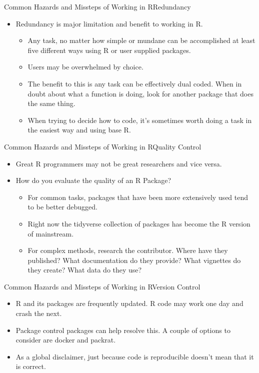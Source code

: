 \documentclass{beamer}
\begin{document}
\begin{frame}{Common Hazards and Missteps of Working in R}{Redundancy}
\begin{itemize}

    \item Redundancy is major limitation and benefit to working in R.
    \begin{itemize}
        \item Any task, no matter how simple or mundane can be accomplished at least five different ways using R or user supplied packages.
        \item Users may be overwhelmed by choice. 
        \item The benefit to this is any task can be effectively dual coded.  When in doubt about what a function is doing, look for another package that does the same thing.
        \item When trying to decide how to code, it's sometimes worth doing a task in the easiest way and using base R.  
    \end{itemize}
\end{itemize}
\end{frame}

\begin{frame}{Common Hazards and Missteps of Working in R}{Quality Control}
\begin{itemize}
    \item Great R programmers may not be great researchers and vice versa.
    \item How do you evaluate the quality of an R Package?
    \begin{itemize}
        \item For common tasks, packages that have been more extensively used tend to be better debugged.  
        \item Right now the tidyverse collection of packages has  become the R version of mainstream.
        \item For complex methods, research the contributor.  Where have they published?  What documentation do they provide?  What vignettes do they create?  What data do they use?
    \end{itemize}
\end{itemize}
\end{frame}

\begin{frame}{Common Hazards and Missteps of Working in R}{Version Control}
\begin{itemize}
    \item R and its packages are frequently updated.  R code may work one day and crash the next.
    \item Package control packages can help resolve this.  A couple of options to consider are docker and packrat.
    \item As a global disclaimer, just because code is reproducible doesn't mean that it is correct.  
    
\end{itemize}
\end{frame}
\end{document}
